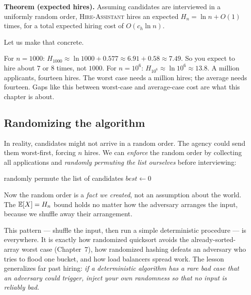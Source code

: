 \begin{formalbox}
\textbf{Theorem (expected hires).} Assuming candidates are interviewed in a
uniformly random order, \textsc{Hire-Assistant} hires an expected $H_n = \ln n +
O(1)$ times, for a total expected hiring cost of $O(c_h \ln n)$.
\end{formalbox}

Let us make that concrete.

\begin{example}
\label{ch05:ex-hiring-numbers}
For $n = 1000$: $H_{1000} \approx \ln 1000 + 0.577 \approx 6.91 + 0.58 \approx
7.49$. So you expect to hire about $7$ or $8$ times, not $1000$. For $n = 10^6$:
$H_{10^6} \approx \ln 10^6 \approx 13.8$. A million applicants, fourteen hires.
The worst case needs a million hires; the average needs fourteen. Gaps like
this between worst-case and average-case cost are what this chapter is about.
\end{example}

\subsection*{Randomizing the algorithm}

In reality, candidates might not arrive in a random order. The agency could send them worst-first, forcing $n$ hires. We can \emph{enforce} the random order by collecting all applications and \emph{randomly permuting the list ourselves} before interviewing:

\begin{algorithm}[htbp]
\caption{\textsc{Randomized-Hire-Assistant}$(n)$}
randomly permute the list of candidates\;
$best \gets 0$\;
\end{algorithm}

Now the random order is a \emph{fact we created}, not an assumption about the world. The $\mathbb{E}[X] = H_n$ bound holds no matter how the adversary arranges the input, because we shuffle away their arrangement.

\begin{aestheticbox}
This pattern --- shuffle the input, then run a simple deterministic procedure ---
is everywhere. It is exactly how randomized quicksort avoids the
already-sorted-array worst case (Chapter~7), how randomized hashing
defeats an adversary who tries to flood one bucket, and how load balancers spread
work. The lesson generalizes far past hiring: \emph{if a deterministic algorithm
has a rare bad case that an adversary could trigger, inject your own randomness
so that no input is reliably bad.}
\end{aestheticbox}

